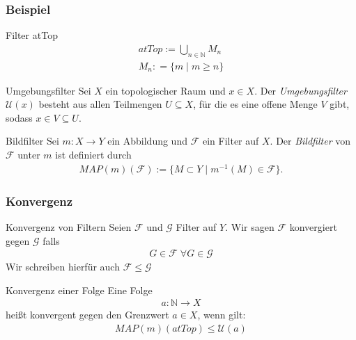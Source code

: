 \documentclass{beamer}
\begin{document}
\begin{frame}
    \frametitle{Beispiel}
   \begin{block}{Filter atTop}
    \begin{align}
        atTop := \bigcup_{n \in \mathbb{N}} M_n  \\
        M_n : = \{ m    \mid m \geq n\}
    \end{align}
    \end{block}   
    \begin{block}{Umgebungsfilter}
      Sei $X$ ein topologischer Raum und $x \in X$. Der \emph{Umgebungsfilter} $\mathcal{U}(x)$ besteht aus allen Teilmengen $U \subseteq X$, für die es eine offene Menge $V$ gibt, sodass $x \in V \subseteq U$.
    \end{block}
    \begin{block}{Bildfilter}
      Sei $m: X \to Y  $ ein Abbildung und $\mathcal{F}$ ein Filter auf $X$. Der \emph{Bildfilter} von $\mathcal{F}$ unter $m$ ist definiert durch 
      \begin{align}
          MAP(m)(\mathcal{F}) := \{ M \subset Y \mid m^{-1} (M) \in \mathcal{F} \}.
      \end{align}
    \end{block}
\end{frame}



\begin{frame}
    \frametitle{Konvergenz}
    \begin{block}{Konvergenz von Filtern}
    Seien  $\mathcal{F}$ und $\mathcal{G}$ Filter auf $Y$. Wir sagen $\mathcal{F}$ konvergiert gegen  $\mathcal{G}$ falls
    \begin{align}
       G \in \mathcal{F} \; \forall G \in \mathcal{G}
    \end{align}
    Wir schreiben hierfür auch $\mathcal{F} \leq \mathcal{G}$
    \end{block}
 
    \begin{block}{Konvergenz einer Folge}
        Eine Folge
    \begin{align*}
            a: \mathbb{N} \rightarrow X
            \end{align*}
    heißt konvergent gegen  den Grenzwert $a \in X$, wenn gilt:
    \begin{align}  
        MAP(m)(atTop) \leq  \mathcal{U}(a)
    \end{align}
\end{block}

\end{frame}
\end{document}
